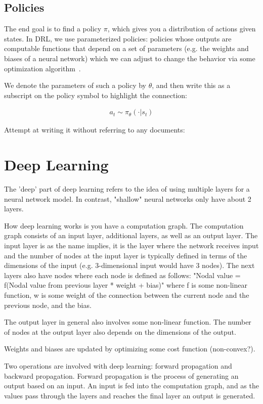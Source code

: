 \subsection{Policies}
The end goal is to find a policy $\pi$, which gives you a distribution of actions given states. In DRL, we use parameterized policies: policies whose outputs are computable functions that depend on a set of parameters (e.g. the weights and biases of a neural network) which we can adjust to change the behavior via some optimization algorithm~\cite{SpinningUp2018}.

We denote the parameters of such a policy by $\theta$, and then write this as a subscript on the policy symbol to highlight the connection:

\begin{align}
a_{t} \sim \pi_{\theta}(\cdot | s_{t})
\end{align}





Attempt at writing it without referring to any documents:
\section{Deep Learning}
The 'deep' part of deep learning refers to the idea of using multiple layers for a neural network model. In contrast, "shallow" neural networks only have about 2 layers.

How deep learning works is you have a computation graph. The computation graph consists of an input layer, additional layers, as well as an output layer. The input layer is as the name implies, it is the layer where the network receives input and the number of nodes at the input layer is typically defined in terms of the dimensions of the input (e.g. 3-dimensional input would have 3 nodes). The next layers also have nodes where each node is defined as follows: "Nodal value = f(Nodal value from previous layer * weight + bias)" where f is some non-linear function, w is some weight of the connection between the current node and the previous node, and the bias.

The output layer in general also involves some non-linear function. The number of nodes at the output layer also depends on the dimensions of the output.

Weights and biases are updated by optimizing some cost function (non-convex?).

Two operations are involved with deep learning: forward propagation and backward propagation. Forward propagation is the process of generating an output based on an input. An input is fed into the computation graph, and as the values pass through the layers and reaches the final layer an output is generated.

